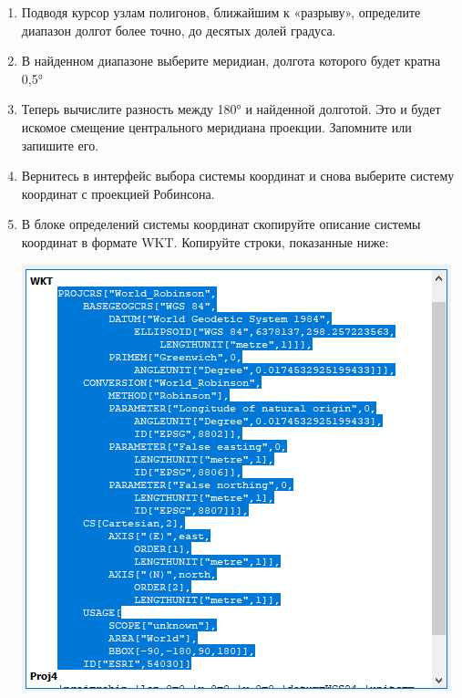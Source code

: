 \documentclass[
  12pt,
]{book}
\begin{document}
\begin{enumerate}
\def\labelenumi{\arabic{enumi}.}
\setcounter{enumi}{4}
\item
  Подводя курсор узлам полигонов, ближайшим к «разрыву», определите диапазон долгот более точно, до десятых долей градуса.
\item
  В найденном диапазоне выберите меридиан, долгота которого будет кратна 0,5°
\item
  Теперь вычислите разность между 180° и найденной долготой. Это и будет искомое смещение центрального меридиана проекции. Запомните или запишите его.
\item
  Вернитесь в интерфейс выбора системы координат и снова выберите систему координат с проекцией Робинсона.
\item
  В блоке определений системы координат скопируйте описание системы координат в формате WKT. Копируйте строки, показанные ниже:

  \includegraphics{images/Ex01_WorldMap/Robinson_WKT.png}


\end{enumerate}
\end{document}
